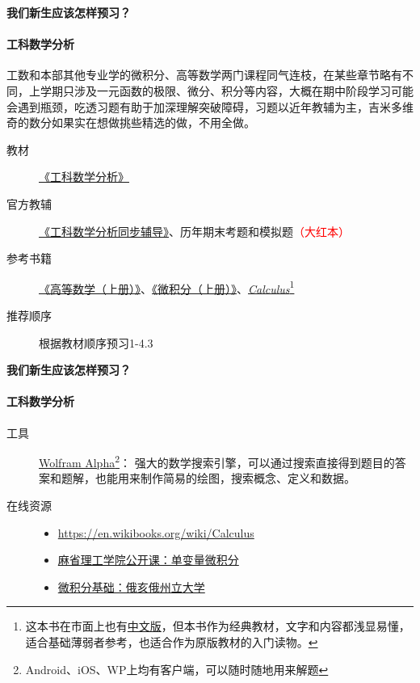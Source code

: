 \documentclass[xcolor={usenames,dvipsnames}]{beamer}
\begin{document}
\begin{frame}{\textbf{我们新生应该怎样预习？}}
\framesubtitle{工科数学分析}
\begin{block}{}
工数和本部其他专业学的微积分、高等数学两门课程同气连枝，在某些章节略有不同，上学期只涉及一元函数的极限、微分、积分等内容，大概在期中阶段学习可能会遇到瓶颈，吃透习题有助于加深理解突破障碍，习题以近年教辅为主，吉米多维奇的数分如果实在想做挑些精选的做，不用全做。
\end{block}
\begin{description}
    \item[教材] \href{http://opac.lib.dlut.edu.cn/opac/item.php?marc_no=2008000575}{《工科数学分析》}
    \item[官方教辅] \href{http://opac.lib.dlut.edu.cn/opac/item.php?marc_no=2010052839}{《工科数学分析同步辅导》}、历年期末考题和模拟题\textcolor{red}{（大红本）}
    \item[参考书籍] \href{http://opac.lib.dlut.edu.cn/opac/item.php?marc_no=2007023436}{《高等数学（上册）》}、\href{http://opac.lib.dlut.edu.cn/opac/item.php?marc_no=2009018280}{《微积分（上册）》}、\href{http://www.cengagebrain.com/content/stewart97815_0538497815_01.01_toc.pdf}{\textit{Calculus}}\footnote{这本书在市面上也有\href{http://item.jd.com/10075433.html}{中文版}，但本书作为经典教材，文字和内容都浅显易懂，适合基础薄弱者参考，也适合作为原版教材的入门读物。}
    \item[推荐顺序] 根据教材顺序预习1-4.3
    
\end{description}
\end{frame}

\begin{frame}{\textbf{我们新生应该怎样预习？}}
\framesubtitle{工科数学分析}
\begin{description}
 \item[工具] \href{http://www.wolframalpha.com/}{Wolfram Alpha}\footnote{Android、iOS、WP上均有客户端，可以随时随地用来解题}： 强大的数学搜索引擎，可以通过搜索直接得到题目的答案和题解，也能用来制作简易的绘图，搜索概念、定义和数据。
 \item[在线资源] \begin{itemize}
 \item \url{https://en.wikibooks.org/wiki/Calculus}
 \item \href{http://open.163.com/special/sp/singlevariablecalculus.html}{麻省理工学院公开课：单变量微积分}
 \item \href{https://www.coursera.org/learn/calculus1}{微积分基础：俄亥俄州立大学} 

 \end{itemize}
\end{description}
\end{frame}
\end{document}
